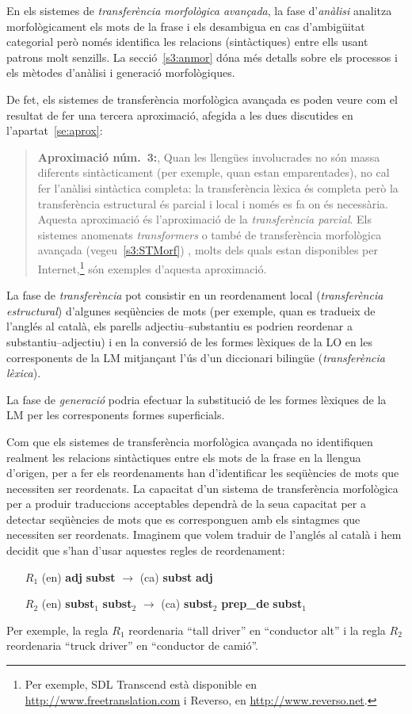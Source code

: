 En els sistemes de \emph{transferència morfològica avançada}, la fase
d'\emph{anàlisi} analitza morfològicament els mots de la frase i els
desambigua en cas d'ambigüitat categorial però només identifica les
relacions (sintàctiques) entre ells usant patrons molt senzills. La
secció~\ref{s3:anmor} dóna més detalls sobre els processos i els
mètodes d'anàlisi i generació morfològiques.

De fet, els sistemes de transferència morfològica avançada es poden
veure com el resultat de fer una tercera aproximació, afegida a les dues discutides en l'apartat~\ref{se:aprox}:
\begin{quote}
  \textbf{Aproximació núm.\ 3:}, Quan les llengües involucrades no són
  massa diferents sintàcticament (per exemple, quan estan
  emparentades), no cal fer l'anàlisi sintàctica completa: la
  transferència lèxica és completa però la transferència estructural
  és parcial i local i només es fa on és necessària.  Aquesta
  aproximació és l'aproximació de la \emph{transferència parcial}. Els
  sistemes anomenats \emph{transformers} o també de transferència
  morfològica avançada (vegeu~\ref{s3:STMorf}) \citep[4.2]{arnold94b},
  molts dels quals estan disponibles per Internet,\footnote{Per
    exemple, SDL Transcend està disponible en
    \url{http://www.freetranslation.com} i Reverso, en
    \url{http://www.reverso.net}.} són exemples d'aquesta aproximació.
\end{quote}


La fase de \emph{transferència} pot consistir en un reordenament local
(\emph{transferència estructural}) d'algunes seqüències de mots (per
exemple, quan es tradueix de l'anglés al català, els parells
adjectiu--substantiu es podrien reordenar a substantiu--adjectiu) i en
la conversió de les formes lèxiques de la LO en les corresponents de
la LM mitjançant l'ús d'un diccionari bilingüe (\emph{transferència
  lèxica}).

La fase de \emph{generació} podria efectuar la substitució de les
formes lèxiques de la LM per les corresponents formes superficials.

Com que els sistemes de transferència morfològica avançada no
identifiquen realment les relacions sintàctiques entre els mots de la frase en
la llengua d'origen, per a fer els reordenaments han d'identificar les
seqüències de mots que necessiten ser reordenats. La capacitat d'un
sistema de transferència morfològica per a produir traduccions
acceptables dependrà de la seua capacitat per a detectar seqüències de
mots que es corresponguen amb els sintagmes que necessiten ser
reordenats.  Imaginem que volem traduir de l'anglés al català i hem
decidit que s'han d'usar aquestes regles de reordenament:
\begin{itemize}
\item [$R_1$] (en) \textbf{adj} \textbf{subst} $\rightarrow$ (ca)
  \textbf{subst} \textbf{adj}
\item [$R_2$] (en) \textbf{subst}$_1$ \textbf{subst}$_2$ $\rightarrow$
  (ca) \textbf{subst}$_2$ \textbf{prep\_de} \textbf{subst}$_1$
\end{itemize}
Per exemple, la regla $R_1$ reordenaria ``tall driver'' en
``conductor alt'' i la regla $R_2$ reordenaria ``truck driver''
en ``conductor de camió''. 

